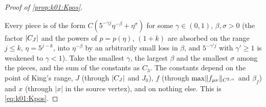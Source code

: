 \begin{proof}[Proof of \cref{prop:k01:Kpos}]
\begin{itemize}[nosep]
\end{itemize}
Every piece is of the form $C(5^{-\gamma j}\eta^{-\beta}+\eta^\sigma)$ for some $\gamma\in(0,1)$, $\beta,\sigma>0$ (the factor $|C_J|$ and the powers of $p=p(\eta)$, $(1+k)$ are absorbed on the range $j\le k$, $\eta=5^{j-k}$, into $\eta^{-\beta}$ by an arbitrarily small loss in $\beta$, and $5^{-\gamma'j}$ with $\gamma'\ge1$ is weakened to $\gamma<1$). Take the smallest $\gamma$, the largest $\beta$ and the smallest $\sigma$ among the pieces, and the sum of the constants as $C_3$. The constants depend on the point of King's range, $J$ (through $|C_J|$ and $J_0$), $f$ (through $\max\lVert f_{\mu\nu}\rVert_{C^{2,\alpha}}$ and $\beta_f$) and $x$ (through $|x|$ in the source vertex), and on nothing else. This is \eqref{eq:k01:Kpos}.
\end{proof}
